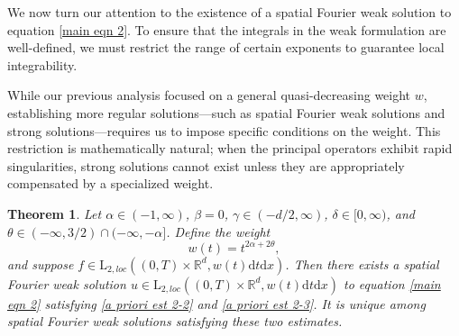 \documentclass[11pt,reqno]{amsart}
\newtheorem{thm}{Theorem}[section]
\theoremstyle{definition}
\theoremstyle{remark}
\newcommand\bR{\mathbb{R}}
\numberwithin{equation}{section}
\begin{document}
We now turn our attention to the existence of a spatial Fourier weak solution to equation \eqref{main eqn 2}. 
To ensure that the integrals in the weak formulation are well-defined, 
we must restrict the range of certain exponents to guarantee local integrability.




While our previous analysis focused on a general quasi-decreasing weight $w$, establishing more regular solutions—such as spatial Fourier weak solutions and strong solutions—requires us to impose specific conditions on the weight. 
This restriction is mathematically natural; when the principal operators exhibit rapid singularities, strong solutions cannot exist unless they are appropriately compensated by a specialized weight.

\begin{thm}
									\label{main appl 2}
Let $\alpha \in (-1,\infty)$, $\beta=0$, $\gamma \in (-d/2,\infty)$, $\delta \in [0,\infty)$, and $\theta \in (-\infty, 3/2) \cap (-\infty,-\alpha]$. Define the weight
$$
w(t)=t^{2\alpha + 2\theta},
$$
and suppose $f \in \mathrm{L}_{2,loc}\left( (0,T) \times \bR^d, w(t)\mathrm{d}t\mathrm{d}x \right)$. 
Then there exists a spatial Fourier weak solution $u \in \mathrm{L}_{2,loc}\left( (0,T) \times \bR^d, w(t)\mathrm{d}t\mathrm{d}x \right)$ to equation \eqref{main eqn 2} satisfying \eqref{a priori est 2-2} and \eqref{a priori est 2-3}. It is unique among spatial Fourier weak solutions satisfying these two estimates.
\end{thm}
\end{document}
